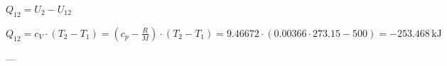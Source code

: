 \( Q_{12} = U_{2} - U_{12} \)  

\( Q_{12} = c_{V} \cdot (T_{2} - T_{1}) = (c_{p} - \frac{R}{M}) \cdot (T_{2} - T_{1}) = 9.46672 \cdot (0.00366 \cdot 273.15 - 500) = -253.468 \, \text{kJ} \)  

---